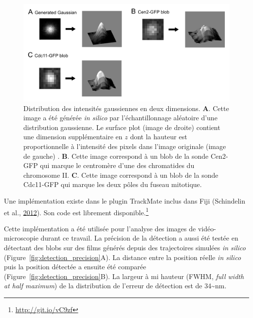 \documentclass[12pt,a4paper,twoside,openright]{book}
\begin{document}
\begin{figure}[htbp]
\centering
\includegraphics{figures/results/imaging/gaussian.png}
\caption[Distribution des intensités gaussiennes en deux dimensions]{\label{fig:gaussian}Distribution
des intensités gaussiennes en deux dimensions. \textbf{A}. Cette image a
été générée \emph{in silico} par l'échantillonnage aléatoire d'une
distribution gaussienne. Le surface plot (image de droite) contient une
dimension supplémentaire en \(z\) dont la hauteur est proportionnelle à
l'intensité des pixels dans l'image originale (image de gauche) .
\textbf{B}. Cette image correspond à un blob de la sonde Cen2-GFP qui
marque le centromère d'une des chromatides du chromosome II. \textbf{C}.
Cette image correspond à un blob de la sonde Cdc11-GFP qui marque les
deux pôles du fuseau mitotique.}
\end{figure}

Une implémentation existe dans le plugin TrackMate inclus dans Fiji
(Schindelin et al., \protect\hyperlink{ref-Schindelin2012}{2012}). Son
code est librement disponible.\footnote{\url{http://git.io/vC9zf}}

Cette implémentation a été utilisée pour l'analyse des images de
vidéo-microscopie durant ce travail. La précision de la détection a
aussi été testée en détectant des blobs sur des films générés depuis des
trajectoires simulées \emph{in silico}
(Figure~\ref{fig:detection_precision}A). La distance entre la position
réelle \emph{in silico} puis la position détectée a ensuite été comparée
(Figure~\ref{fig:detection_precision}B). La largeur à mi hauteur (FWHM,
\emph{full width at half maximum}) de la distribution de l'erreur de
détection est de 34\textasciitilde{}nm.
\end{document}
